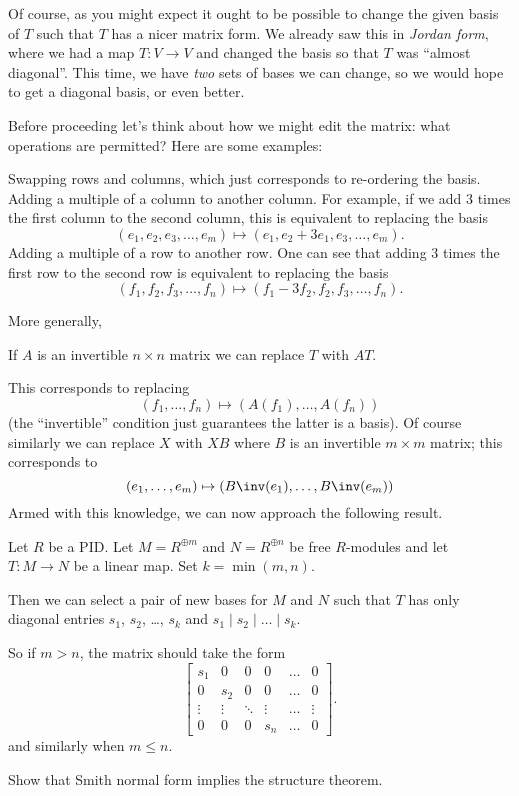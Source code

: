 Of course, as you might expect it ought to be possible to change the
given basis of $T$ such that $T$ has a nicer matrix form.
We already saw this in \emph{Jordan form},
where we had a map $T : V \to V$ and changed the basis
so that $T$ was ``almost diagonal''.
This time, we have \emph{two} sets of bases we can change,
so we would hope to get a diagonal basis, or even better.

Before proceeding let's think about how we might edit the matrix:
what operations are permitted?  Here are some examples:
\begin{itemize}
	\ii Swapping rows and columns, which just corresponds
	to re-ordering the basis.
	\ii Adding a multiple of a column to another column.
	For example, if we add $3$ times the first column to the second column,
	this is equivalent to replacing the basis 
	\[ (e_1, e_2, e_3, \dots, e_m) \mapsto (e_1, e_2+3e_1, e_3, \dots, e_m). \]
	\ii Adding a multiple of a row to another row.
	One can see that adding $3$ times the first row to the second row
	is equivalent to replacing the basis 
	\[ (f_1, f_2, f_3, \dots, f_n) \mapsto (f_1-3f_2, f_2, f_3, \dots, f_n). \]
\end{itemize}
More generally,
\begin{moral}
	If $A$ is an invertible $n \times n$ matrix we can
	replace $T$ with $AT$.
\end{moral}
This corresponds to replacing 
\[ (f_1, \dots, f_n) \mapsto (A(f_1), \dots, A(f_n)) \]
(the ``invertible'' condition just guarantees the latter is a basis).
Of course similarly we can replace $X$ with $XB$
where $B$ is an invertible $m \times m$ matrix;
this corresponds to 
\[ (e_1, \dots, e_m) \mapsto (B\inv(e_1), \dots, B\inv(e_m)) \]
Armed with this knowledge, we can now approach the following result.

\begin{theorem}
	Let $R$ be a PID.
	Let $M = R^{\oplus m}$ and $N = R^{\oplus n}$ be free $R$-modules
	and let $T : M \to N$ be a linear map.
	Set $k = \min(m,n)$.

	Then we can select a pair of new bases for $M$ and $N$ such that 
	$T$ has only diagonal entries $s_1$, $s_2$, \dots, $s_k$
	and $s_1 \mid s_2 \mid \dots \mid s_k$.
\end{theorem}
So if $m > n$, the matrix should take the form
\[
	\begin{bmatrix} 
		s_1 & 0 & 0 & 0 & \dots & 0 \\
		0 & s_2 & 0 & 0 & \dots & 0 \\
		\vdots & \vdots & \ddots & \vdots & \dots & \vdots \\
		0 & 0 & 0 & s_n & \dots & 0
	\end{bmatrix}.
\]
and similarly when $m \le n$.
\begin{ques}
	Show that Smith normal form implies the structure theorem.
\end{ques}

